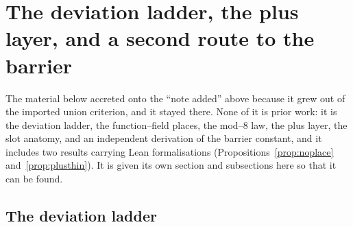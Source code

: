\documentclass[11pt]{article}
\theoremstyle{definition}
\begin{document}
\section{The deviation ladder, the plus layer, and a second route to the barrier}\label{sec:ladderplus}

The material below accreted onto the ``note added'' above because it grew out of the imported
union criterion, and it stayed there. None of it is prior work: it is the deviation ladder, the
function--field places, the mod--$8$ law, the plus layer, the slot anatomy, and an independent
derivation of the barrier constant, and it includes two results carrying Lean formalisations
(Propositions~\ref{prop:noplace} and~\ref{prop:plusthin}). It is given its own section and
subsections here so that it can be found.

\subsection{The deviation ladder}\label{ssec:ladder}
\end{document}
